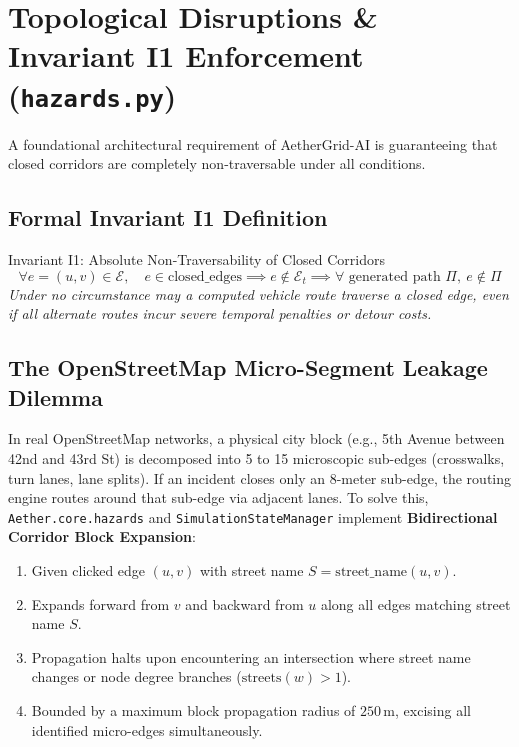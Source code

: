\documentclass[10pt,a4paper]{article}
\begin{document}
\newpage
\section{Topological Disruptions \& Invariant I1 Enforcement (\texttt{hazards.py})}

A foundational architectural requirement of AetherGrid-AI is guaranteeing that closed corridors are completely non-traversable under all conditions.

\subsection{Formal Invariant I1 Definition}

\begin{specbox}{Invariant I1: Absolute Non-Traversability of Closed Corridors}
$$\forall e = (u, v) \in \mathcal{E}, \quad e \in \text{closed\_edges} \implies e \notin \mathcal{E}_t \implies \forall \text{ generated path } \Pi, \ e \notin \Pi$$
\textit{Under no circumstance may a computed vehicle route traverse a closed edge, even if all alternate routes incur severe temporal penalties or detour costs.}
\end{specbox}

\subsection{The OpenStreetMap Micro-Segment Leakage Dilemma}
In real OpenStreetMap networks, a physical city block (e.g., 5th Avenue between 42nd and 43rd St) is decomposed into 5 to 15 microscopic sub-edges (crosswalks, turn lanes, lane splits). If an incident closes only an 8-meter sub-edge, the routing engine routes around that sub-edge via adjacent lanes.
To solve this, \texttt{Aether.core.hazards} and \texttt{SimulationStateManager} implement \textbf{Bidirectional Corridor Block Expansion}:
\begin{enumerate}\setlength{\itemsep}{0.5pt}\setlength{\topsep}{1pt}
  \item Given clicked edge $(u, v)$ with street name $S = \text{street\_name}(u, v)$.
  \item Expands forward from $v$ and backward from $u$ along all edges matching street name $S$.
  \item Propagation halts upon encountering an intersection where street name changes or node degree branches ($\text{streets}(w) > 1$).
  \item Bounded by a maximum block propagation radius of $250\,\text{m}$, excising all identified micro-edges simultaneously.
\end{enumerate}
\end{document}
